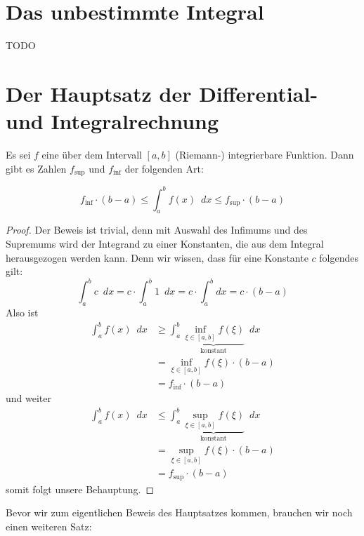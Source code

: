 \section{Das unbestimmte Integral}
TODO

\section{Der Hauptsatz der Differential- und Integralrechnung}

\begin{satz}\label{satz:mittel}
Es sei $f$ eine über dem Intervall $[a,b]$ (Riemann-) integrierbare Funktion. Dann gibt es Zahlen $f_{\sup}$ und $f_{\inf}$ der folgenden Art:

\begin{equation}
f_{\inf}\cdot (b-a) \le \int_{a}^{b} f(x) \enspace dx \le f_{\sup} \cdot (b-a)
\end{equation}
\end{satz}
\begin{proof}
Der Beweis ist trivial, denn mit Auswahl des Infimums und des Supremums wird der Integrand zu einer Konstanten, die aus dem Integral herausgezogen werden kann. Denn wir wissen, dass für eine Konstante $c$ folgendes gilt:
\begin{equation}
\int_a^b c \enspace dx = c\cdot \int_a^b 1 \enspace dx = c\cdot \int_a^b dx = c\cdot(b-a)
\end{equation}
Also ist
\begin{equation}
\begin{split}
\int_a^b f(x)\enspace dx &\ge \int_a^b \underbrace{\inf_{\xi \in [a,b] } f(\xi)}_{\text{konstant}} \enspace dx \\
 &= \inf_{\xi \in [a,b] } f(\xi) \cdot (b-a) \\
 &= f_{\inf}\cdot (b-a)
\end{split}
\end{equation}
und weiter
\begin{equation}
\begin{split}
\int_a^b f(x)\enspace dx &\le \int_a^b \underbrace{\sup_{\xi \in [a,b] } f(\xi)}_{\text{konstant}} \enspace dx \\
 &= \sup_{\xi \in [a,b] } f(\xi) \cdot (b-a) \\
 &= f_{\sup}\cdot (b-a)
\end{split}
\end{equation}
somit folgt unsere Behauptung.
\end{proof}

Bevor wir zum eigentlichen Beweis des Hauptsatzes kommen, brauchen wir noch einen weiteren Satz:

